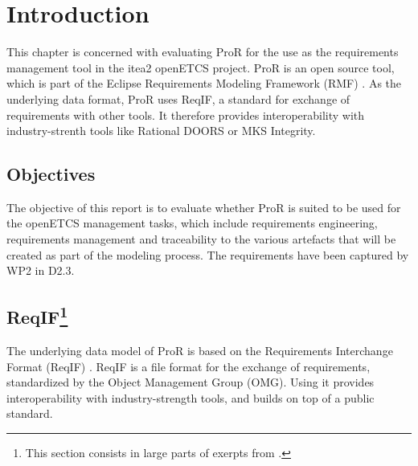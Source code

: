 \documentclass{template/openetcs_report}
\begin{document}
\tableofcontents
\listoffiguresandtables




\mainmatter

\chapter{Introduction}

This chapter is concerned with evaluating ProR for the use as the requirements management tool in the itea2 openETCS project.  ProR is an open source tool, which is part of the Eclipse Requirements Modeling Framework (RMF) \cite{RMF}.  As the underlying data format, ProR uses ReqIF, a standard for exchange of requirements with other tools.  It therefore provides interoperability with industry-strenth tools like Rational DOORS or MKS Integrity.

\section{Objectives}

The objective of this report is to evaluate whether ProR is suited to be used for the openETCS management tasks, which include requirements engineering, requirements management and traceability to the various artefacts that will be created as part of the modeling process.  The requirements have been captured by WP2 in D2.3.

\section{ReqIF\footnote{This section consists in large parts of exerpts from \cite{RMF_Mark_Book_Jastram_2013}.}}

The underlying data model of ProR is based on the Requirements Interchange Format (ReqIF) \cite{omg_requirements_2011}.  ReqIF is a file format for the exchange of requirements, standardized by the Object Management Group (OMG).  Using it provides interoperability with industry-strength tools, and builds on top of a public standard.
\end{document}

